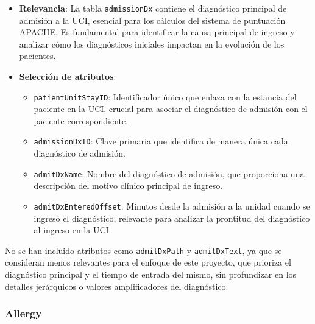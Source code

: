 \documentclass[12pt, a4paper, twoside]{article}
\begin{document}
	\begin{itemize}
		\item \textbf{Relevancia}: La tabla \texttt{admissionDx} contiene el diagnóstico principal de admisión a la UCI, esencial para los cálculos del sistema de puntuación APACHE. Es fundamental para identificar la causa principal de ingreso y analizar cómo los diagnósticos iniciales impactan en la evolución de los pacientes.
		
		\item \textbf{Selección de atributos}:
		\begin{itemize}
			\item \texttt{patientUnitStayID}: Identificador único que enlaza con la estancia del paciente en la UCI, crucial para asociar el diagnóstico de admisión con el paciente correspondiente.
			\item \texttt{admissionDxID}: Clave primaria que identifica de manera única cada diagnóstico de admisión.
			\item \texttt{admitDxName}: Nombre del diagnóstico de admisión, que proporciona una descripción del motivo clínico principal de ingreso.
			\item \texttt{admitDxEnteredOffset}: Minutos desde la admisión a la unidad cuando se ingresó el diagnóstico, relevante para analizar la prontitud del diagnóstico al ingreso en la UCI.
		\end{itemize}
		
	\end{itemize}
	
	No se han incluido atributos como \texttt{admitDxPath} y \texttt{admitDxText}, ya que se consideran menos relevantes para el enfoque de este proyecto, que prioriza el diagnóstico principal y el tiempo de entrada del mismo, sin profundizar en los detalles jerárquicos o valores amplificadores del diagnóstico. \cite{eICU2024}
	
	
	\subsubsection{Allergy}
	
\end{document}
